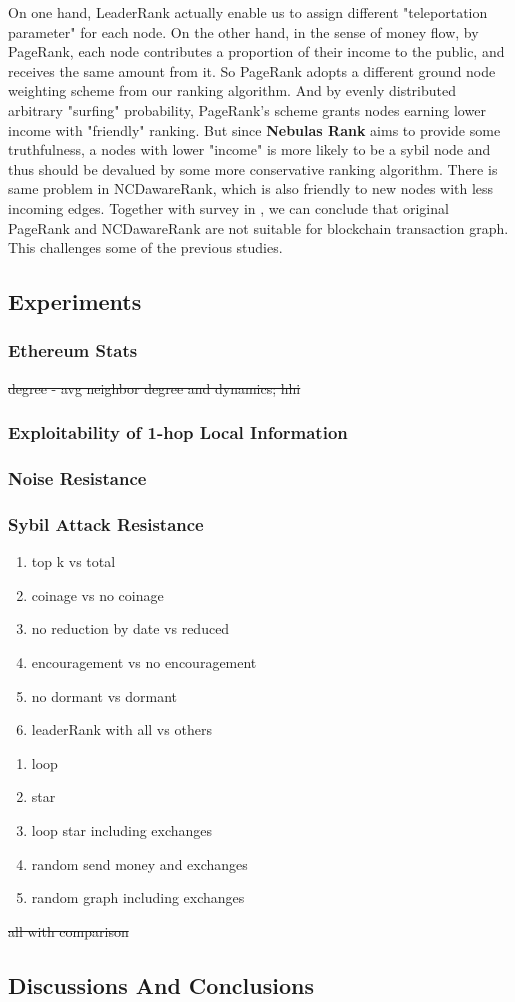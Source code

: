 On one hand, LeaderRank actually enable us to assign different "teleportation parameter" for each node. On the other hand, in the sense of money flow, by PageRank, each node contributes a proportion of their income to the public, and receives the same amount from it. So PageRank adopts a different ground node weighting scheme from our ranking algorithm. And by evenly distributed arbitrary "surfing" probability, PageRank's scheme grants nodes earning lower income with "friendly" ranking. But since \textbf{Nebulas Rank} aims to provide some truthfulness, a nodes with lower "income" is more likely to be a sybil node and thus should be devalued by some more conservative ranking algorithm. There is same problem in NCDawareRank\cite{Nikolakopoulos2013}, which is also friendly to new nodes with less incoming edges. Together with survey in , we can conclude that original PageRank and NCDawareRank are not suitable for blockchain transaction graph. This challenges some of the previous studies\cite{Fleder2015}\cite{nem}.

\subsection{Experiments} \label{sec:exp}

\subsubsection{Ethereum Stats}
\st{degree - avg neighbor degree and dynamics; hhi}
\subsubsection{Exploitability of 1-hop Local Information}
\subsubsection{Noise Resistance}
\subsubsection{Sybil Attack Resistance}
\begin{enumerate}
\item top k vs total
\item coinage vs no coinage
\item no reduction by date vs reduced
\item encouragement vs no encouragement
\item no dormant vs dormant
\item leaderRank with all vs others
\end{enumerate}
\begin{enumerate}
	\item loop
	\item star
	\item loop star including exchanges
	\item random send money and exchanges
	\item random graph including exchanges
\end{enumerate}

\st{all with comparison}

\subsection{Discussions And Conclusions} \label{sec:discuss}
